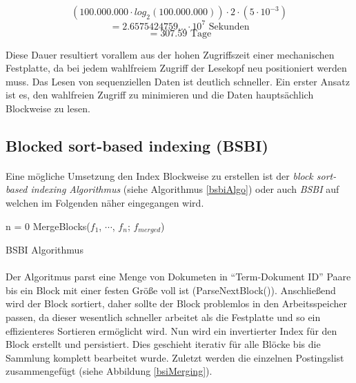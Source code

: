 \[(100.000.000 \cdot log_2 (100.000.000)) \cdot 2 \cdot (5 \cdot 10^{-3}) \]
\[ = 2.6575424759... \cdot 10^7 \text{ Sekunden}\]
\[ = 307.59 \text{ Tage} \]

Diese Dauer resultiert vorallem aus der hohen Zugriffszeit einer mechanischen Festplatte, da bei jedem wahlfreiem Zugriff der Lesekopf neu positioniert werden muss. Das Lesen von sequenziellen Daten ist deutlich schneller. Ein erster Ansatz ist es, den wahlfreien Zugriff zu minimieren und die Daten hauptsächlich Blockweise zu lesen.
\par

\subsection{Blocked sort-based indexing (BSBI)}
\paragraph{}
Eine mögliche Umsetzung den Index Blockweise zu erstellen ist der \textit{block sort-based indexing Algorithmus} (siehe Algorithmus \ref{bsbiAlgo}) oder auch \textit{BSBI} auf welchen im Folgenden näher eingegangen wird.
\par
\begin{algorithm}
 n = 0\;
  MergeBlocks($f_1$, $\cdots$, $f_n$; $f_{merged}$)\;
\caption{BSBI Algorithmus} \label{bsbiAlgo}
\end{algorithm}

\paragraph{}
Der Algoritmus parst eine Menge von Dokumeten in \enquote{Term-Dokument ID} Paare bis ein Block mit einer festen Größe voll ist (ParseNextBlock()). Anschließend wird der Block sortiert, daher sollte der Block problemlos in den Arbeitsspeicher passen, da dieser wesentlich schneller arbeitet als die Festplatte und so ein effizienteres Sortieren ermöglicht wird. Nun wird ein invertierter Index für den Block erstellt und persistiert. Dies geschieht iterativ für alle Blöcke bis die Sammlung komplett bearbeitet wurde. Zuletzt werden die einzelnen Postingslist zusammengefügt (siehe Abbildung \ref{bsiMerging}).
\par

